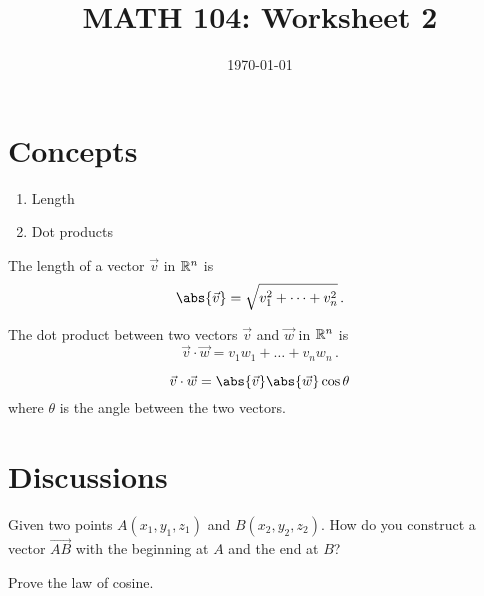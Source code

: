 \documentclass[12pt]{amsart}
\title{ MATH 104: Worksheet 2}
\author{}
\date{\today}
\begin{document}
\maketitle

\section{Concepts}

\begin{enumerate}
	\item Length
	\item Dot products
\end{enumerate}


\begin{definition}
	The length of a vector $\vec{v}$ in $\mathbb{R}^n$ is
	\begin{equation*}
		\abs{ \vec{v}} = \sqrt{ v_1^2 + \dots + v_n^2 } \,.
	\end{equation*}
\end{definition}

\begin{definition}
	The dot product between two vectors $\vec{v}$ and $\vec{w}$ in $\mathbb{R}^n$ is
	\begin{equation*}
		\vec{v} \cdot \vec{w} = v_1 w_1 + \dots + v_n w_n \,.
	\end{equation*}
\end{definition}


\begin{theorem}
	\begin{equation*}
		\vec{v} \cdot \vec{w} = \abs{\vec{v}} \abs{ \vec{w}} \cos\theta
	\end{equation*}
	where $\theta$ is the angle between the two vectors.
\end{theorem}

\section{Discussions}

\begin{question}
	Given two points $A(x_1,y_1, z_1)$ and $B(x_2, y_2, z_2)$.
	How do you construct a vector $\vec{AB}$ with the beginning at $A$ and the end at $B$?
\end{question}
\vspace{5cm}

\begin{question}
	Prove the law of cosine.
\end{question}
\vspace{5cm}
\end{document}
